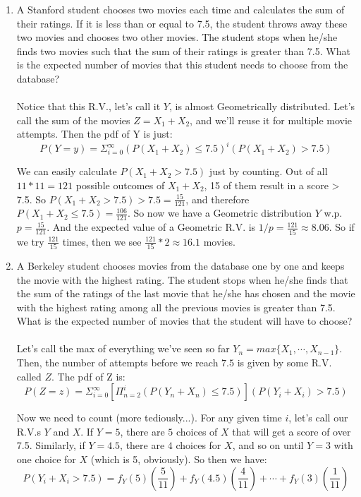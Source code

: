 \begin{enumerate}
    \begin{enumerate}
      \item A Stanford student chooses two movies each time and calculates the sum of their ratings. If it is less than or equal to 7.5, the student throws away these two movies and chooses two other movies. The student stops when he/she finds two movies such that the sum of their ratings is greater than 7.5. What is the expected number of movies that this student needs to choose from the database?\\\\

        Notice that this R.V., let's call it $Y$, is almost Geometrically distributed. Let's call the sum of the movies $Z = X_1 + X_2$, and we'll reuse it for multiple movie attempts. Then the pdf of Y is just:
        $$P(Y = y) = \Sigma_{i=0}^{\infty} (P(X_1 + X_2) \leq 7.5)^i(P(X_1 + X_2) > 7.5)$$

        We can easily calculate $P(X_1 + X_2 > 7.5)$ just by counting. Out of all $11*11 = 121$ possible outcomes of $X_1 + X_2$, 15 of them result in a score > 7.5. So $P(X_1 + X_2 > 7.5) > 7.5 = \frac{15}{121}$, and therefore $P(X_1 + X_2 \leq 7.5) = \frac{106}{121}$. So now we have a Geometric distribution $Y$ w.p. $p = \frac{15}{121}$. And the expected value of a Geometric R.V. is $1/p = \frac{121}{15} \approx 8.06$. So if we try $\frac{121}{15}$ times, then we see $\frac{121}{15} * 2 \approx 16.1$ movies.

      \item A Berkeley student chooses movies from the database one by one and keeps the movie with the highest rating. The student stops when he/she finds that the sum of the ratings of the last movie that he/she has chosen and the movie with the highest rating among all the previous movies is greater than 7.5. What is the expected number of movies that the student will have to choose?\\\\

        Let's call the max of everything we've seen so far $Y_n = max\{X_1, \cdots, X_{n-1} \}$. Then, the number of attempts before we reach $7.5$ is given by some R.V. called $Z$. The pdf of Z is:
        $$P(Z = z) = \Sigma_{i=0}^{\infty} [\Pi_{n=2}^i (P(Y_n + X_n) \leq 7.5)] (P(Y_i + X_i) > 7.5)$$

        Now we need to count (more tediously...). For any given time $i$, let's call our R.V.s $Y$ and $X$. If $Y = 5$, there are $5$ choices of $X$ that will get a score of over 7.5. Similarly, if $Y = 4.5$, there are $4$ choices for $X$, and so on until $Y = 3$ with one choice for $X$ (which is 5, obviously). So then we have:
        $$P(Y_i + X_i > 7.5) = f_Y(5)(\frac{5}{11}) + f_Y(4.5)(\frac{4}{11}) + \cdots + f_Y(3)(\frac{1}{11})$$
    \end{enumerate}


\end{enumerate}
